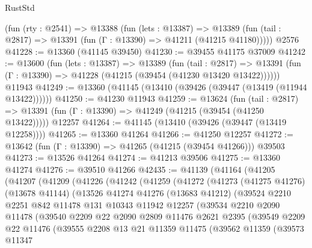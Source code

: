 \begin{lexlean}{RustStd}
\begin{coremodule}
    (fun (rty : @2541) =>
    @13388
      (fun (lets : @13387) =>
      @13389 (fun (tail : @2817) => @13391 (fun (Γ : @13390) => @41211 (@41215 @41180)))))
    @2576
@41228 := @13360 (@41145 @39450)
@41230 := @39455 @41175 @37009
@41242 := @13600
    (fun (lets : @13387) =>
    @13389
      (fun (tail : @2817) =>
      @13391 (fun (Γ : @13390) => @41228 (@41215 (@39454 (@41230 @13420 @13422))))))
    @11943
@41249 := @13360 (@41145 (@13410 (@39426 (@39447 (@13419 (@11944 @13422))))))
@41250 := @41230 @11943
@41259 := @13624
    (fun (tail : @2817) => @13391 (fun (Γ : @13390) => @41249 (@41215 (@39454 (@41250 @13422)))))
    @12257
@41264 := @41145 (@13410 (@39426 (@39447 (@13419 @12258))))
@41265 := @13360 @41264
@41266 := @41250 @12257
@41272 := @13642 (fun (Γ : @13390) => @41265 (@41215 (@39454 @41266))) @39503
@41273 := @13526 @41264
@41274 := @41213 @39506
@41275 := @13360 @41274
@41276 := @39510 @41266
@42435 := @41139
    (@41164
      (@41205
        (@41207
          (@41209
            (@41226
              (@41242
                (@41259
                  (@41272
                    (@41273
                      (@41275 @41276)
                      (@13678 @41144)
                      (@13526
                        @41274
                        @41276
                        (@13683 @41212)
                        (@39524
                          @2210
                          @2251
                          @842
                          @11478
                          @131
                          @10343
                          @11942
                          @12257
                          (@39534
                            @2210
                            @2090
                            @11478
                            (@39540
                              @2209
                              @22
                              @2090
                              @2809
                              @11476
                              @2621
                              @2395
                              (@39549
                                @2209
                                @22
                                @11476
                                (@39555
                                  @2208
                                  @13
                                  @21
                                  @11359
                                  @11475
                                  (@39562
                                    @11359
                                    (@39573
                                      @11347

\end{coremodule}
\end{lexlean}
